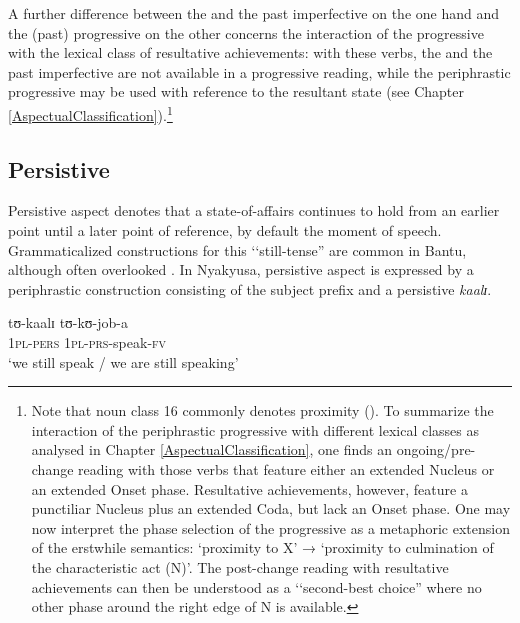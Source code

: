 A further difference between the  and the past imperfective on the one hand and the (past) progressive on the other concerns the interaction of the progressive with the lexical class of resultative achievements: with these verbs, the  and the past imperfective are not available in a progressive reading, while the periphrastic progressive may be used with reference to the resultant state (see Chapter \ref{AspectualClassification}).\footnote{Note that  noun class 16 commonly denotes proximity (). To summarize the interaction of the periphrastic progressive with different lexical classes as analysed in Chapter \ref{AspectualClassification}, one finds an ongoing/pre-change reading with those verbs that feature either an extended Nucleus or an extended Onset phase. Resultative achievements, however, feature a punctiliar Nucleus plus an extended Coda, but lack an Onset phase. One may now interpret the phase selection of the progressive as a metaphoric extension of the erstwhile  semantics: \lq proximity to X' → \lq proximity to culmination of the characteristic act (N)'. The post-change reading with resultative achievements can then be understood as a \lq\lq second-best choice'' where no other phase around the right edge of N is available.}
\subsection{Persistive}\label{Persistive}
Persistive aspect denotes that a state-of-affairs continues to hold from an earlier point until a later point of reference, by default the moment of speech. Grammaticalized constructions for this \lq\lq still-tense'' are common in Bantu, although often overlooked \citep[45]{NurseD2008}.
In Nyakyusa, persistive aspect is expressed by a periphrastic construction consisting of the subject prefix and a persistive  \textit{kaalɪ}.

\begin{exe}
\ex \label{exPersistiveIntroductory}\gll tʊ-kaalɪ tʊ-kʊ-job-a\\
\textsc{1pl}-\textsc{pers} \textsc{1pl}-\textsc{prs}-speak-\textsc{fv}\\
\glt `we still speak / we are still speaking'
\end{exe}


